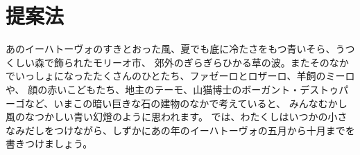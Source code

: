 \chapter{提案法}
 あのイーハトーヴォのすきとおった風、夏でも底に冷たさをもつ青いそら、うつくしい森で飾られたモリーオ市、
 郊外のぎらぎらひかる草の波。またそのなかでいっしょになったたくさんのひとたち、ファゼーロとロザーロ、羊飼のミーロや、
 顔の赤いこどもたち、地主のテーモ、山猫博士のボーガント・デストゥパーゴなど、いまこの暗い巨きな石の建物のなかで考えていると、
 みんなむかし風のなつかしい青い幻燈のように思われます。
 では、わたくしはいつかの小さなみだしをつけながら、しずかにあの年のイーハトーヴォの五月から十月までを書きつけましょう。